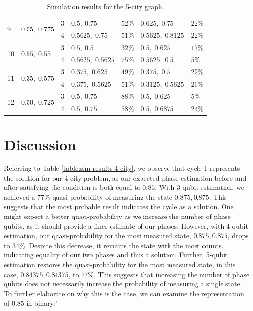 \documentclass[msc,oneside]{ubcthesis}
\begin{document}
\begin{table}[ht!]
\begin{tabular}{lllllll}
			\hline
			\multirow{2}{*}{9} & \multirow{2}{*}{$0.55, \; 0.775$} & 3 & $0.5, \; 0.75$ & $52\%$ &  $0.625, \; 0.75$  & $22\%$ \\
			&                          & 4& $0.5625, \; 0.75$ & $51\%$ &  $0.5625, \; 0.8125$  & $22\%$ \\
			\hline
			\multirow{2}{*}{10} & \multirow{2}{*}{$0.55, \; 0.55$ } & 3 & $0.5, \; 0.5$ & $32\%$ &  $0.5, \; 0.625$  & $17\%$ \\
			&                          & 4& $0.5625, \; 0.5625$ & $75\%$ &  $0.5625, \; 0.5$  & $5\%$ \\
			\hline
			\multirow{2}{*}{11} & \multirow{2}{*}{$0.35, \; 0.575$} & 3 & $0.375, \; 0.625$ & $49\%$ &  $0.375, \; 0.5$  & $22\%$ \\
			&                          & 4& $0.375, \; 0.5625$ & $51\%$ &  $0.3125, \; 0.5625$  & $20\%$ \\
			\hline
			\multirow{2}{*}{12} & \multirow{2}{*}{$0.50, \; 0.725$ } & 3 & $0.5, \; 0.75$ & $88\%$ &  $0.5, \; 0.625$  & $5\%$ \\
			&                          & 4& $0.5, \; 0.75$ & $58\%$ &  $0.5, \; 0.6875$  & $24\%$ \\
			
			\bottomrule
		\end{tabular}
		\caption{Simulation results for the 5-city graph.}
		\label{table:sim-results-5-city}
	\end{table} 
	
	
 	
	
	
	\chapter{Discussion}
	
Referring to Table \ref{table:sim-results-4-city}, we observe that cycle 1 represents the solution for our 4-city problem, as our expected phase estimation before and after satisfying the condition is both equal to $0.85$. With 3-qubit estimation, we achieved a $77\%$ quasi-probability of measuring the state $0.875, 0.875$. This suggests that the most probable result indicates the cycle as a solution. One might expect a better quasi-probability as we increase the number of phase qubits, as it should provide a finer estimate of our phases. However, with 4-qubit estimation, our quasi-probability for the most measured state, $0.875, 0.875$, drops to $34\%$. Despite this decrease, it remains the state with the most counts, indicating equality of our two phases and thus a solution. Further, 5-qubit estimation restores the quasi-probability for the most measured state, in this case, $0.84375, 0.84375$, to $77\%$. This suggests that increasing the number of phase qubits does not necessarily increase the probability of measuring a single state. To further elaborate on why this is the case, we can examine the representation of $0.85$ in binary:"
	
\end{document}
